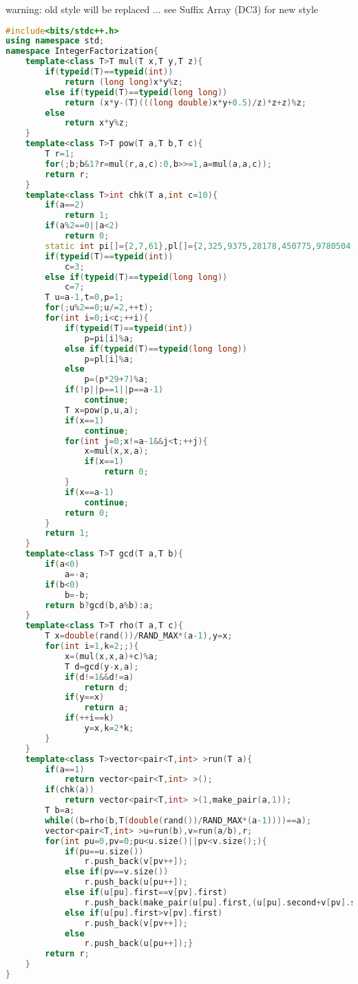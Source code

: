 \documentclass{book}
\begin{document}
warning: old style will be replaced ... see Suffix Array (DC3) for new style\begin{lstlisting}[language=C++,title={Integer Factorization (Pollard's Rho Algorithm).hpp (2848 bytes, 93 lines)}]
#include<bits/stdc++.h>
using namespace std;
namespace IntegerFactorization{
    template<class T>T mul(T x,T y,T z){
        if(typeid(T)==typeid(int))
            return (long long)x*y%z;
        else if(typeid(T)==typeid(long long))
            return (x*y-(T)(((long double)x*y+0.5)/z)*z+z)%z;
        else
            return x*y%z;
    }
    template<class T>T pow(T a,T b,T c){
        T r=1;
        for(;b;b&1?r=mul(r,a,c):0,b>>=1,a=mul(a,a,c));
        return r;
    }
    template<class T>int chk(T a,int c=10){
        if(a==2)
            return 1;
        if(a%2==0||a<2)
            return 0;
        static int pi[]={2,7,61},pl[]={2,325,9375,28178,450775,9780504,1795265022};
        if(typeid(T)==typeid(int))
            c=3;
        else if(typeid(T)==typeid(long long))
            c=7;
        T u=a-1,t=0,p=1;
        for(;u%2==0;u/=2,++t);
        for(int i=0;i<c;++i){
            if(typeid(T)==typeid(int))
                p=pi[i]%a;
            else if(typeid(T)==typeid(long long))
                p=pl[i]%a;
            else
                p=(p*29+7)%a;
            if(!p||p==1||p==a-1)
                continue;
            T x=pow(p,u,a);
            if(x==1)
                continue;
            for(int j=0;x!=a-1&&j<t;++j){
                x=mul(x,x,a);
                if(x==1)
                    return 0;
            }
            if(x==a-1)
                continue;
            return 0;
        }
        return 1;
    }
    template<class T>T gcd(T a,T b){
        if(a<0)
            a=-a;
        if(b<0)
            b=-b;
        return b?gcd(b,a%b):a;
    }
    template<class T>T rho(T a,T c){
        T x=double(rand())/RAND_MAX*(a-1),y=x;
        for(int i=1,k=2;;){
            x=(mul(x,x,a)+c)%a;
            T d=gcd(y-x,a);
            if(d!=1&&d!=a)
                return d;
            if(y==x)
                return a;
            if(++i==k)
                y=x,k=2*k;
        }
    }
    template<class T>vector<pair<T,int> >run(T a){
        if(a==1)
            return vector<pair<T,int> >();
        if(chk(a))
            return vector<pair<T,int> >(1,make_pair(a,1));
        T b=a;
        while((b=rho(b,T(double(rand())/RAND_MAX*(a-1))))==a);
        vector<pair<T,int> >u=run(b),v=run(a/b),r;
        for(int pu=0,pv=0;pu<u.size()||pv<v.size();){
            if(pu==u.size())
                r.push_back(v[pv++]);
            else if(pv==v.size())
                r.push_back(u[pu++]);
            else if(u[pu].first==v[pv].first)
                r.push_back(make_pair(u[pu].first,(u[pu].second+v[pv].second))),++pu,++pv;
            else if(u[pu].first>v[pv].first)
                r.push_back(v[pv++]);
            else
                r.push_back(u[pu++]);}
        return r;
    }
}
\end{lstlisting}
\end{document}
